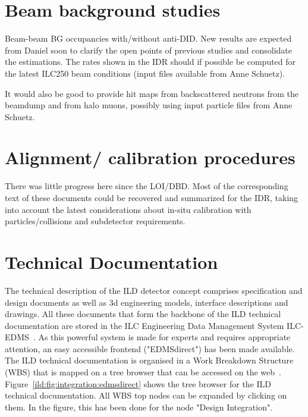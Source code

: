 \vspace{2cm}

\section{Beam background studies}

Beam-beam BG occupancies with/without anti-DID. New results are expected from Daniel soon to clarify the open points of previous studies and consolidate the estimations. The rates shown in the IDR should if possible be computed for the latest ILC250 beam conditions (input files available from Anne Schuetz).

It would also be good to provide hit maps from backscattered neutrons from the beamdump and from halo muons, possibly using input particle files from Anne Schuetz.

\vspace{2cm}

\section{Alignment/ calibration procedures}

There was little progress here since the LOI/DBD. Most of the corresponding text of these documents could be recovered and summarized for the IDR, taking into account the latest considerations about in-situ calibration with particles/collisions and subdetector requirements.

\vspace{2cm}

\section{Technical Documentation}

The technical description of the ILD detector concept comprises specification and design documents as well as 3d engineering models, interface descriptions and drawings. All these documents that form the backbone of the ILD technical documentation are stored in the ILC Engineering Data Management System ILC-EDMS~\cite{ild:bib:edms}. As this powerful system is made for experts and requires appropriate attention, an easy accessible frontend ("EDMSdirect") has been made available. The ILD technical documentation is organised in a Work Breakdown Structure (WBS) that is mapped on a tree browser that can be accessed on the web~\cite{ild:bib:edmsdirect}. Figure~\ref{ild:fig:integration:edmsdirect} shows the tree browser for the ILD technical documentation. All WBS top nodes can be expanded by clicking on them. In the figure, this has been done for the node "Design Integration".

